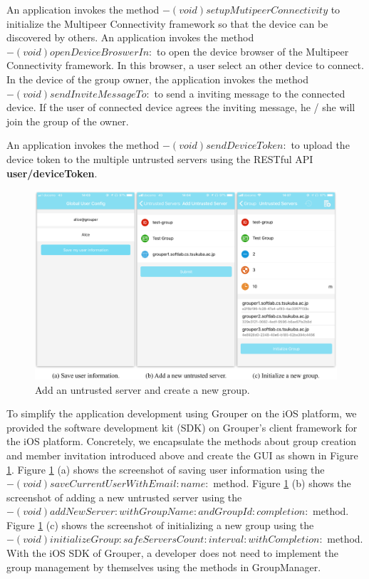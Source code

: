 \documentclass[a4paper,11pt]{report}
\begin{document}
An application invokes the method $- (void)setupMutipeerConnectivity$ to initialize the Multipeer Connectivity framework so that the device can be discovered by others.
An application invokes the method $- (void)openDeviceBroswerIn:$ to open the device browser of the Multipeer Connectivity framework.
In this browser, a user select an other device to connect.
In the device of the group owner, the application invokes the method $- (void)sendInviteMessageTo:$ to send a inviting message to the connected device.
If the user of connected device agrees the inviting message, he / she will join the group of the owner.

An application invokes the method $- (void)sendDeviceToken:$ to upload the device token to the multiple untrusted servers using the RESTful API \textbf{user/deviceToken}.

\begin{figure}[t]
	\centering
	\includegraphics[scale=0.58]{group_manager_screenshot}
	\caption{Add an untrusted server and create a new group.}
	\label{fig:group_manager_screenshot}
\end{figure}

To simplify the application development using Grouper on the iOS platform, we provided the software development kit (SDK) on Grouper's client framework for the iOS platform.
Concretely, we encapsulate the methods about group creation and member invitation introduced above and create the GUI as shown in Figure \ref{fig:group_manager_screenshot}.
Figure \ref{fig:group_manager_screenshot} (a) shows the screenshot of saving user information using the  $- (void)saveCurrentUserWithEmail:name:$ method.
Figure \ref{fig:group_manager_screenshot} (b) shows the screenshot of adding a new untrusted server using the  $- (void)addNewServer:withGroupName:andGroupId:completion:$ method.
Figure \ref{fig:group_manager_screenshot} (c) shows the screenshot of initializing a new group using the  $- (void)initializeGroup:safeServersCount:interval:withCompletion:$ method.
With the iOS SDK of Grouper, a developer does not need to implement the group management by themselves using the methods in GroupManager. 
\end{document}
